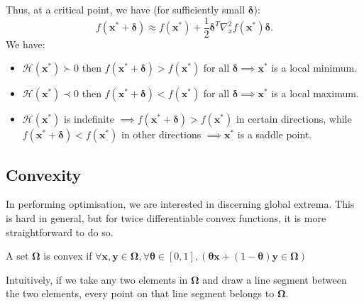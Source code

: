 Thus, at a critical point, we have (for sufficiently small $\boldsymbol{\delta}$):
\[f(\mathbf{x^{*}+\delta})\approx f(\mathbf{x^{*}})
+\frac{1}{2}\boldsymbol{\delta}^{T}\nabla_x^2
f(\mathbf{{x}^{*}})\boldsymbol{\delta}.\] 
We have:
\begin{itemize}
  \item $\mathcal{H}(\mathbf{x}^*) \succ 0$ then $f(\mathbf{x}^* +
    \boldsymbol{\delta}) > f(\mathbf{x}^*)$ for all
    $\boldsymbol{\delta}\implies\mathbf{x}^*$ is a local minimum.
  \item $\mathcal{H}(\mathbf{x}^*) \prec 0$ then $f(\mathbf{x}^* +
    \boldsymbol{\delta}) < f(\mathbf{x}^*)$ for all
    $\boldsymbol{\delta}\implies\mathbf{x}^*$ is a local maximum.
  \item $\mathcal{H}(\mathbf{x}^*)$ is indefinite $\implies f(\mathbf{x}^* +
    \boldsymbol{\delta}) > f(\mathbf{x}^*)$ in certain directions, while
    $f(\mathbf{x}^* + \boldsymbol{\delta}) < f(\mathbf{x}^*)$ in other
    directions $\implies\mathbf{x}^*$ is a saddle point. 
\end{itemize}

\subsection{Convexity}
In performing optimisation, we are interested in discerning global extrema.
This is hard in general, but for twice differentiable convex functions, it is
more straightforward to do so.
\begin{definition}
  A set $\boldsymbol{\Omega}$ is convex if $\forall \mathbf{x,y\in
  \Omega,\forall\theta\in} [0,1],(\mathbf{\theta
  x}+(1-\mathbf{\theta})\mathbf{y\in \Omega})$
\end{definition}
Intuitively, if we take any two elements in $\boldsymbol{\Omega}$ and draw a
line segment between the two elements, every point on that line segment belongs
to $\mathbf{\Omega}$.

